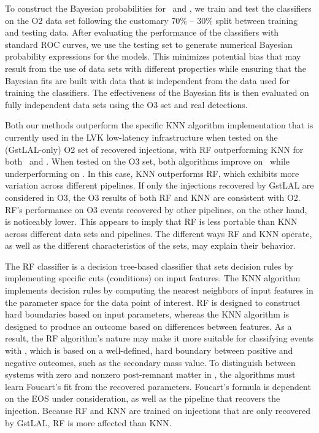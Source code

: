 To construct the Bayesian probabilities for \hasns\ and \hasrem, we train and test the classifiers on the \ac{O2} data set following the customary 70\% -- 30\% split between
training and testing data. After evaluating the performance of the classifiers with standard \ac{ROC} curves, we use the testing set to generate numerical Bayesian probability
expressions for the models. This minimizes potential bias that may result from the use of data sets with different properties while ensuring that the Bayesian fits are built with
data that is independent from the data used for training the classifiers. The effectiveness of the Bayesian fits is then evaluated on fully independent data sets using the
\ac{O3} set and real detections. 

Both our methods outperform the specific  \ac{KNN} algorithm implementation that is currently used in the \ac{LVK} low-latency infrastructure when tested on the (GstLAL-only) \ac{O2} set of recovered injections, with
\ac{RF} outperforming \ac{KNN} for both \hasns\ and \hasrem. When tested on the \ac{O3} set, both algorithms improve on \hasns\ while underperforming on \hasrem.  In this case,
\ac{KNN} outperforms \ac{RF}, which exhibits more variation across different pipelines.  If only the injections recovered by GstLAL are considered in \ac{O3}, the \ac{O3} results of
both \ac{RF} and \ac{KNN} are consistent with \ac{O2}. \ac{RF}'s performance on \ac{O3} events recovered by other pipelines, on the other hand, is noticeably lower. This appears to
imply that \ac{RF} is less portable than \ac{KNN} across different data sets and pipelines. The different ways \ac{RF} and \ac{KNN} operate, as well as the different characteristics
of the sets, may explain their behavior.

The RF classifier is a decision tree-based classifier that sets decision rules by implementing specific cuts (conditions) on input features. The \ac{KNN} algorithm implements decision rules by computing the nearest neighbors of input features in the parameter space for the data point of interest. \ac{RF} is designed to construct hard boundaries based on input parameters, whereas the \ac{KNN} algorithm is designed to produce an outcome based on differences between features. As a result, the \ac{RF} algorithm's nature may make it more suitable for classifying events with \hasns, which is based on a well-defined, hard boundary between positive and negative outcomes, such as the secondary mass value. To distinguish between systems with zero and nonzero post-remnant matter in \hasrem, the algorithms must learn Foucart's fit from the recovered parameters. Foucart's formula is dependent on the \ac{EOS} under consideration, as well as the pipeline that recovers the injection. Because \ac{RF} and \ac{KNN} are trained on injections that are only recovered by GstLAL, \ac{RF} is more affected than \ac{KNN}.

